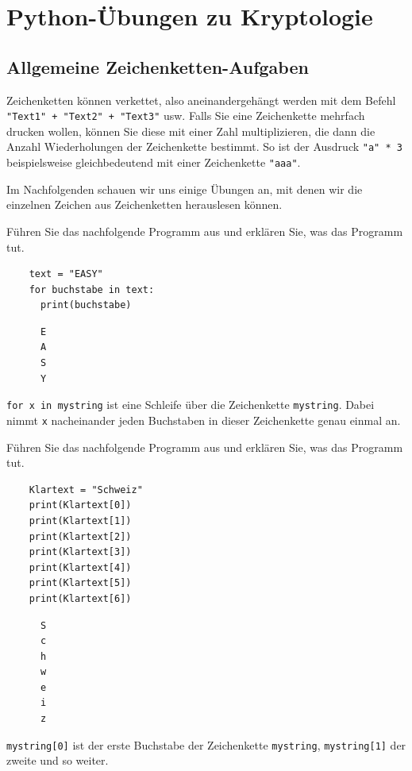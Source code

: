 \chapter{Python-Übungen zu Kryptologie}\label{ch:Kryptologie-Python}

\section{Allgemeine Zeichenketten-Aufgaben}
Zeichenketten können verkettet, also aneinandergehängt werden mit dem Befehl \lstinline|"Text1" + "Text2" + "Text3"| usw. Falls Sie eine Zeichenkette mehrfach drucken wollen, können Sie diese mit einer Zahl multiplizieren, die dann die Anzahl Wiederholungen der Zeichenkette bestimmt. So ist der Ausdruck \lstinline|"a" * 3| beispielsweise gleichbedeutend mit einer Zeichenkette \lstinline|"aaa"|.

Im Nachfolgenden schauen wir uns einige Übungen an, mit denen wir die einzelnen Zeichen aus Zeichenketten herauslesen können.

\begin{myexercise}
	Führen Sie das nachfolgende Programm aus und erklären Sie, was das Programm tut.
	\begin{lstlisting}
    text = "EASY"
    for buchstabe in text:
      print(buchstabe)
  \end{lstlisting}
	\begin{myanswer}
		\begin{lstlisting}
      E
      A
      S
      Y
    \end{lstlisting}
		\lstinline|for x in mystring| ist eine Schleife über die Zeichenkette \lstinline|mystring|. Dabei nimmt \lstinline|x| nacheinander jeden Buchstaben in dieser Zeichenkette genau einmal an.
	\end{myanswer}
\end{myexercise}

\begin{myexercise}\label{myexercise:index}
	Führen Sie das nachfolgende Programm aus und erklären Sie, was das Programm tut.
	\begin{lstlisting}
    Klartext = "Schweiz"
    print(Klartext[0])
    print(Klartext[1])
    print(Klartext[2])
    print(Klartext[3])
    print(Klartext[4])
    print(Klartext[5])
    print(Klartext[6])
  \end{lstlisting}
	\begin{myanswer}
		\begin{lstlisting}
      S
      c
      h
      w
      e
      i
      z
    \end{lstlisting}
		\lstinline|mystring[0]| ist der erste Buchstabe der Zeichenkette \lstinline|mystring|, \lstinline|mystring[1]| der zweite und so weiter.
	\end{myanswer}
\end{myexercise}

